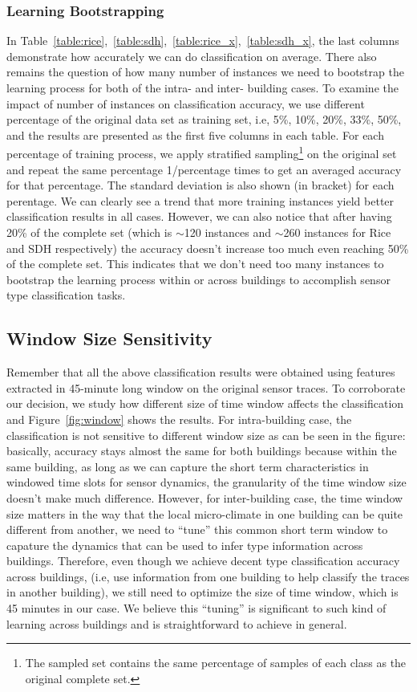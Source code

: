 \subsubsection{Learning Bootstrapping}
In Table~\ref{table:rice},~\ref{table:sdh},~\ref{table:rice_x},~\ref{table:sdh_x}, the last columns demonstrate how accurately we can do classification on average. There also remains the question of how many number of instances we need to bootstrap the learning process for both of the intra- and inter- building cases. To examine the impact of number of instances on classification accuracy, we use different percentage of the original data set as training set, i.e, 5\%, 10\%, 20\%, 33\%,
50\%, and the results are presented as the first five columns in each table. For each percentage of training process, we apply stratified sampling\footnote{The sampled set contains the same percentage of samples of each class as the original complete set.} on the original set and repeat the same percentage 1/percentage times to get an averaged accuracy for that percentage. The standard deviation is also shown (in bracket) for each perentage. We can clearly see a trend that more
training instances yield better classification results in all cases. However, we can also notice that after having 20\% of the complete set (which is $\sim$120 instances and $\sim$260 instances for Rice and SDH respectively) the accuracy doesn't increase too much even reaching 50\% of the complete set. This indicates that we don't need too many instances to bootstrap the learning process within or across buildings to accomplish sensor type classification tasks.

\subsection{Window Size Sensitivity}
Remember that all the above classification results were obtained using features extracted in 45-minute long window on the original sensor traces. To corroborate our decision, we study how different size of time window affects the classification and Figure~\ref{fig:window} shows the results. For intra-building case, the classification is not sensitive to different window size as can be seen in the figure: basically, accuracy stays almost the same for both buildings because within the same building, as long as we can capture the short term characteristics in windowed time slots for sensor dynamics, the granularity of the time window size doesn't make much difference. However, for inter-building case, the time window size matters in the way that the local micro-climate in one building can be quite different from another, we need to ``tune'' this common short term window to capature the dynamics that can be used to infer type information across buildings. Therefore, even though we achieve decent type classification accuracy across buildings, (i.e, use information from one building to help classify the traces in another building), we still need to optimize the size of time window, which is 45 minutes in our case. We believe this ``tuning'' is significant to such kind of learning across buildings and is straightforward to achieve in general.


